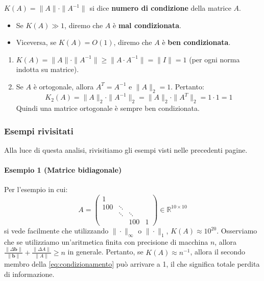\begin{definition}
$K(A) = \| A \| \cdot \| A^{-1} \|$ si dice \textbf{numero di condizione} della matrice $A$.
\end{definition}
\begin{itemize}
    \item Se $K(A) \gg 1$, diremo che $A$ è \textbf{mal condizionata}.
    \item Viceversa, se $K(A) = O(1)$, diremo che $A$ è \textbf{ben condizionata}.
\end{itemize}

\begin{osservazione}
\begin{enumerate}
    \item $K(A) = \| A \| \cdot \| A^{-1} \| \ge \| A \cdot A^{-1} \| = \| I \| = 1$ (per ogni norma indotta su matrice).
    \item Se $A$ è ortogonale, allora $A^T = A^{-1}$ e $\| A \|_2=1$. Pertanto:
    $$ K_2(A) = \| A \|_2 \cdot \| A^{-1} \|_2 = \| A \|_2 \cdot \| A^T \|_2 = 1 \cdot 1 = 1 $$
    Quindi una matrice ortogonale è sempre ben condizionata.
\end{enumerate}
\end{osservazione}

\subsubsection{Esempi rivisitati}
Alla luce di questa analisi, rivisitiamo gli esempi visti nelle precedenti pagine.

\paragraph{Esempio 1 (Matrice bidiagonale)}
Per l'esempio in cui:
$$ A = \begin{pmatrix} 1 & & \\ 100 & \ddots \\ & \ddots & \ddots \\ & & 100& 1 \end{pmatrix} \in \mathbb{R}^{10 \times 10} $$
si vede facilmente che utilizzando $\| \cdot \|_\infty$ o $\| \cdot \|_1$, $K(A) \approx 10^{20}$.
Osserviamo che se utilizziamo un'aritmetica finita con precisione di macchina $n$, allora $\frac{\| \Delta\mathbf{b} \|}{\| \mathbf{b} \|} + \frac{\| \Delta A \|}{\| A \|} \ge n$ in generale.
Pertanto, se $K(A) \approx n^{-1}$, allora il secondo membro della \eqref{eq:condizionamento} può arrivare a 1, il che significa totale perdita di informazione.

